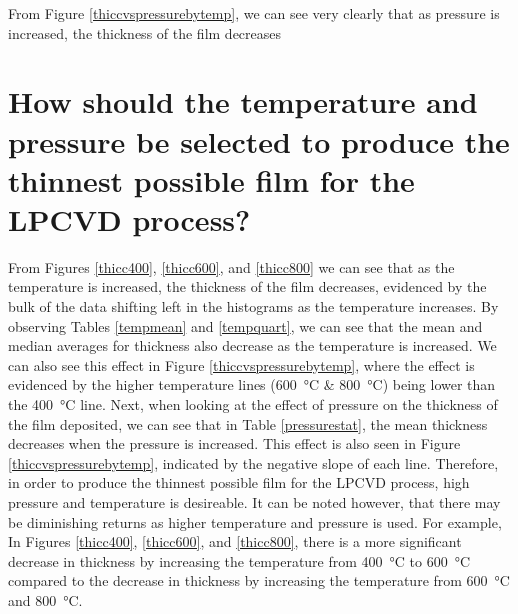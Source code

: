 \documentclass[letterpaper]{article}
\begin{document}
From Figure \ref{thiccvspressurebytemp}, we can see very clearly that as pressure
is increased, the thickness of the film decreases

\section{How should the temperature and pressure be selected to produce the thinnest possible film for the LPCVD process?}

From Figures \ref{thicc400}, \ref{thicc600}, and \ref{thicc800} we can see that
as the temperature is increased, the thickness of the film decreases, evidenced
by the bulk of the data shifting left in the histograms as the temperature
increases. By observing Tables \ref{tempmean} and \ref{tempquart}, we can see
that the mean and median averages for thickness also decrease as the temperature
is increased. We can also see this effect in Figure \ref{thiccvspressurebytemp},
where the effect is evidenced by the higher temperature lines
(\SI{600}{\celsius} \& \SI{800}{\celsius}) being lower than the
\SI{400}{\celsius} line. Next, when looking at the effect of pressure on the
thickness of the film deposited, we can see that in Table \ref{pressurestat},
the mean thickness decreases when the pressure is increased. This effect is also
seen in Figure \ref{thiccvspressurebytemp}, indicated by the negative slope of
each line. Therefore, in order to produce the thinnest possible film for the
LPCVD process, high pressure and temperature is desireable. It can be noted
however, that there may be diminishing returns as higher temperature and
pressure is used. For example, In Figures \ref{thicc400}, \ref{thicc600}, and
\ref{thicc800}, there is a more significant decrease in thickness by increasing
the temperature from \SI{400}{\celsius} to \SI{600}{\celsius} compared to the
decrease in thickness by increasing the temperature from \SI{600}{\celsius}
and \SI{800}{\celsius}.
\end{document}
